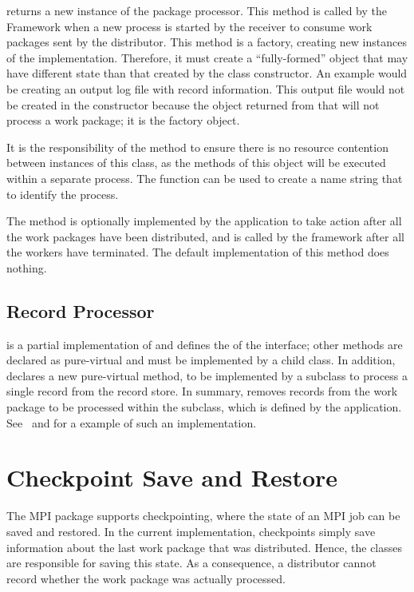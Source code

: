  returns a new instance of the package processor.
This method is called by the Framework when a new process is started by the
receiver to consume work packages sent by the distributor. This method is a
factory, creating new instances of the 
implementation. Therefore, it must create a ``fully-formed'' object that may
have different state than that created by the class constructor. An example
would be creating an output log file with record information.
This output file would not be created in the constructor because the
object returned from that will not process a work package; it is the factory
object.

It is the
responsibility of the  method to ensure there is no
resource contention between instances of this class, as the methods of this
object will be executed within a separate process. The
 function can be used to create a name string
that to identify the process.

The  method is optionally implemented by the
application to take action after all the work packages have been distributed,
and is called by the framework after all the workers have terminated. The
default implementation of this method does nothing.

\subsection{Record Processor}
\label{sec-recordprocessor}
 is a partial implementation of 
 and defines the 
of the  interface; other methods are declared as
pure-virtual and must be implemented by a child class. In addition,
 declares a new pure-virtual method,
 to be implemented by a subclass to process a single
record from the record store. In summary,  removes
records from the work package to be processed within the subclass,
which is defined by the application.
See~ and  for a example of
such an implementation.

\section{Checkpoint Save and Restore}
\label{sec-checkpointing}
The MPI package supports checkpointing, where the state of an MPI job can be
saved and restored. In the current implementation, checkpoints simply save
information about the last work package that was distributed. Hence, the
 classes are responsible for saving this state. As a
consequence, a distributor cannot record whether the work package was
actually processed.


